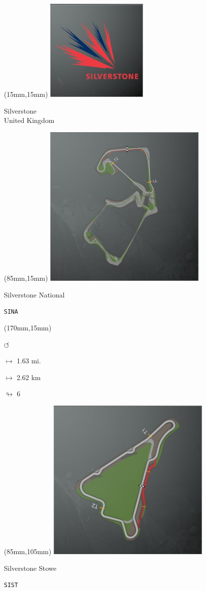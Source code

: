 \begin{textblock*}{60mm}(15mm,15mm)%
\includegraphics[width=50mm]{LG/2015-05-20_00094.png}
\par Silverstone\\ United Kingdom
\end{textblock*}
\begin{textblock*}{80mm}(85mm,15mm)%
\includegraphics[width=80mm]{TR/2015-05-20_00058.png}
\centerline{Silverstone National}
\par\hfill\tiny\tt SINA\\
\end{textblock*}
\begin{textblock*}{30mm}(170mm,15mm)%
\par \Huge$\circlearrowleft$
\Large
\par$\mapsto$ 1.63 mi.
\par$\mapsto$ 2.62 km
\par$\looparrowright$ 6
\end{textblock*}
\begin{textblock*}{80mm}(85mm,105mm)%
\includegraphics[width=80mm]{TR/2015-05-20_00059.png}
\centerline{Silverstone Stowe}
\par\hfill\tiny\tt SIST\\
\end{textblock*}
